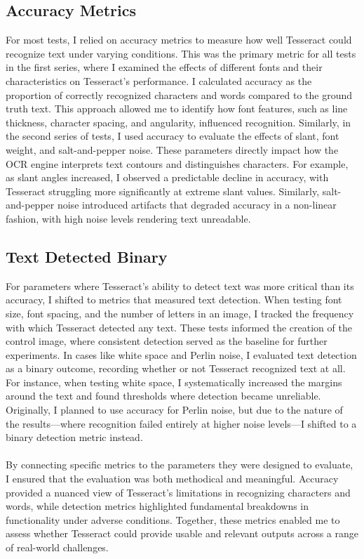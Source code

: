 \documentclass[10pt,twocolumn]{article}
\begin{document}
\subsection{Accuracy Metrics}
For most tests, I relied on accuracy metrics to measure how well Tesseract could recognize text under varying conditions. This was the primary metric for all tests in the first series, where I examined the effects of different fonts and their characteristics on Tesseract’s performance. I calculated accuracy as the proportion of correctly recognized characters and words compared to the ground truth text. This approach allowed me to identify how font features, such as line thickness, character spacing, and angularity, influenced recognition. Similarly, in the second series of tests, I used accuracy to evaluate the effects of slant, font weight, and salt-and-pepper noise. These parameters directly impact how the OCR engine interprets text contours and distinguishes characters. For example, as slant angles increased, I observed a predictable decline in accuracy, with Tesseract struggling more significantly at extreme slant values. Similarly, salt-and-pepper noise introduced artifacts that degraded accuracy in a non-linear fashion, with high noise levels rendering text unreadable.
\subsection{Text Detected Binary}
For parameters where Tesseract’s ability to detect text was more critical than its accuracy, I shifted to metrics that measured text detection. When testing font size, font spacing, and the number of letters in an image, I tracked the frequency with which Tesseract detected any text. These tests informed the creation of the control image, where consistent detection served as the baseline for further experiments. In cases like white space and Perlin noise, I evaluated text detection as a binary outcome, recording whether or not Tesseract recognized text at all. For instance, when testing white space, I systematically increased the margins around the text and found thresholds where detection became unreliable. Originally, I planned to use accuracy for Perlin noise, but due to the nature of the results—where recognition failed entirely at higher noise levels—I shifted to a binary detection metric instead.
\paragraph{}
By connecting specific metrics to the parameters they were designed to evaluate, I ensured that the evaluation was both methodical and meaningful. Accuracy provided a nuanced view of Tesseract’s limitations in recognizing characters and words, while detection metrics highlighted fundamental breakdowns in functionality under adverse conditions. Together, these metrics enabled me to assess whether Tesseract could provide usable and relevant outputs across a range of real-world challenges.
\end{document}
